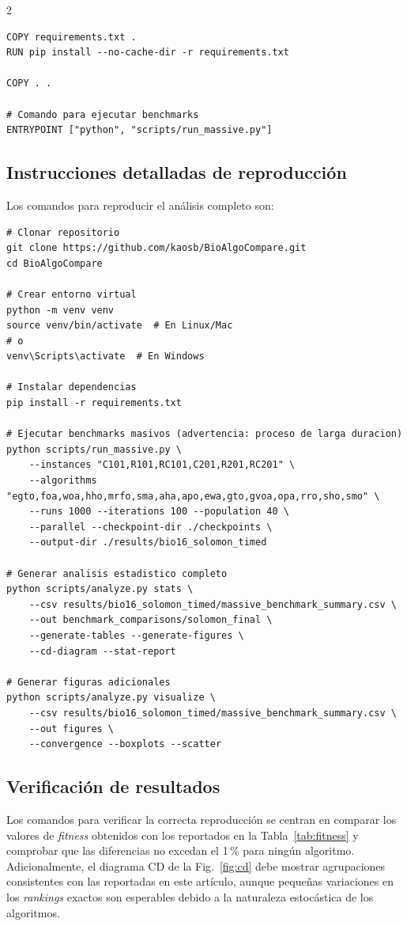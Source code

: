 \documentclass[10pt,a4paper]{extarticle}
\begin{document}
\begin{multicols}{2}
\begin{lstlisting}
COPY requirements.txt .
RUN pip install --no-cache-dir -r requirements.txt

COPY . .

# Comando para ejecutar benchmarks
ENTRYPOINT ["python", "scripts/run_massive.py"]
\end{lstlisting}

\subsection{Instrucciones detalladas de reproducción}
Los comandos para reproducir el análisis completo son:
\begin{lstlisting}
# Clonar repositorio
git clone https://github.com/kaosb/BioAlgoCompare.git
cd BioAlgoCompare

# Crear entorno virtual
python -m venv venv
source venv/bin/activate  # En Linux/Mac
# o
venv\Scripts\activate  # En Windows

# Instalar dependencias
pip install -r requirements.txt

# Ejecutar benchmarks masivos (advertencia: proceso de larga duracion)
python scripts/run_massive.py \
    --instances "C101,R101,RC101,C201,R201,RC201" \
    --algorithms "egto,foa,woa,hho,mrfo,sma,aha,apo,ewa,gto,gvoa,opa,rro,sho,smo" \
    --runs 1000 --iterations 100 --population 40 \
    --parallel --checkpoint-dir ./checkpoints \
    --output-dir ./results/bio16_solomon_timed

# Generar analisis estadistico completo
python scripts/analyze.py stats \
    --csv results/bio16_solomon_timed/massive_benchmark_summary.csv \
    --out benchmark_comparisons/solomon_final \
    --generate-tables --generate-figures \
    --cd-diagram --stat-report

# Generar figuras adicionales
python scripts/analyze.py visualize \
    --csv results/bio16_solomon_timed/massive_benchmark_summary.csv \
    --out figures \
    --convergence --boxplots --scatter
\end{lstlisting}

\subsection{Verificación de resultados}
Los comandos para verificar la correcta reproducción se centran en comparar los valores de \textit{fitness} obtenidos con los reportados en la Tabla~\ref{tab:fitness} y comprobar que las diferencias no excedan el 1\,\% para ningún algoritmo. Adicionalmente, el diagrama CD de la Fig.~\ref{fig:cd} debe mostrar agrupaciones consistentes con las reportadas en este artículo, aunque pequeñas variaciones en los \textit{rankings} exactos son esperables debido a la naturaleza estocástica de los algoritmos.
\end{multicols}
\end{document}
